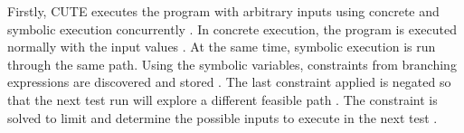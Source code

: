 Firstly, CUTE executes the program with arbitrary inputs using concrete and symbolic execution concurrently \cite{CUTE}.
In concrete execution, the program is executed normally with the input values \cite{CUTE}. At the same time, symbolic execution is run through the same path. Using the symbolic variables, constraints from branching expressions are discovered and stored \cite{CUTE}. The last constraint applied is negated so that the next test run will explore a different feasible path \cite{CUTE}. The constraint is solved to limit and determine the possible inputs to execute in the next test \cite{CUTE}.
	

